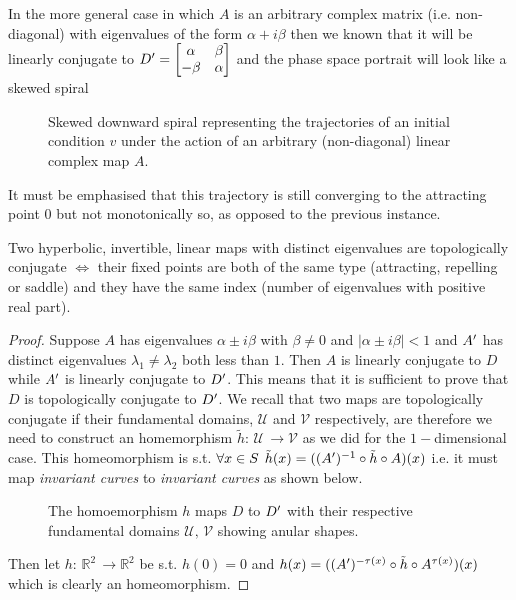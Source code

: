 \documentclass[../main.tex]{subfiles}
\begin{document}
\begin{interpretation*}{}
In the more general case in which $A$ is an arbitrary complex matrix (i.e. non-diagonal) with eigenvalues of the form $\alpha + i \beta$ then we known that it will be linearly conjugate to $D'=\begin{bmatrix}
             \alpha & \beta \\
             -\beta & \alpha
     \end{bmatrix}$
and the phase space portrait will look like a skewed spiral
\begin{figure}[H]
    \centering 
    \caption{Skewed downward spiral representing the trajectories of an initial condition $v$ under the action of an arbitrary (non-diagonal) linear complex map $A$.}
    \label{fig3}
\end{figure}
It must be emphasised that this trajectory is still converging to the attracting point $0$ but not monotonically so, as opposed to the previous instance.
\end{interpretation*}
\begin{theorem}[label=thm2]{}{}
     Two hyperbolic, invertible, linear maps with distinct eigenvalues are topologically conjugate $\iff$ their fixed points are both of the same type (attracting, repelling or saddle) and they have the same index (number of eigenvalues with positive real part).
\end{theorem}
\begin{proof}
     Suppose $A$ has eigenvalues $\alpha \pm i \beta$ with $\beta\neq0$ and $|\alpha \pm i \beta|<1$ and $A'$ has distinct eigenvalues $\lambda_{1}\neq \lambda_{2}$ both less than $1$. Then $A$ is linearly conjugate to $D$ while $A'$ is linearly conjugate to $D'$. This means that it is sufficient to prove that $D$ is topologically conjugate to $D'$. 
     We recall that two maps are topologically conjugate if their fundamental domains, $\mathcal{U}$ and $\mathcal{V}$ respectively, are therefore we need to construct an homemorphism $\tilde{h}:\,\mathcal{U}\,\to \mathcal{V}$ as we did for the $1-$dimensional case. 
     This homeomorphism is s.t. $\forall x \in S \;\,\tilde{h}(x)=((A')^{-1}\circ\tilde{h}\circ A)(x)$ i.e. it must map \textit{invariant curves} to \textit{invariant curves} as shown below. 
\begin{figure}[H]
    \centering 
    \caption{The homoemorphism $h$ maps $D$ to $D'$ with their respective fundamental domains $\mathcal{U},\,\mathcal{V}$ showing anular shapes.}
    \label{fig9}
\end{figure}
Then let $h:\,\mathbb{R}^{2}\,\to \mathbb{R}^{2}$ be s.t. $h(0)=0$ and $h(x)=((A')^{-\tau(x)}\circ \tilde{h}\circ A^{\tau(x)})(x)$ which is clearly an homeomorphism.
\end{proof}
\end{document}
